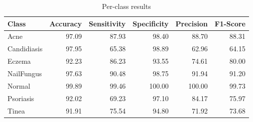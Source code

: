 \begin{table}
\caption{Per-class results}
\label{tab:results}
\begin{tabular}{lrrrrr}
\toprule
Class & Accuracy & Sensitivity & Specificity & Precision & F1-Score \\
\midrule
Acne & 97.09 & 87.93 & 98.40 & 88.70 & 88.31 \\
Candidiasis & 97.95 & 65.38 & 98.89 & 62.96 & 64.15 \\
Eczema & 92.23 & 86.23 & 93.55 & 74.61 & 80.00 \\
NailFungus & 97.63 & 90.48 & 98.75 & 91.94 & 91.20 \\
Normal & 99.89 & 99.46 & 100.00 & 100.00 & 99.73 \\
Psoriasis & 92.02 & 69.23 & 97.10 & 84.17 & 75.97 \\
Tinea & 91.91 & 75.54 & 94.80 & 71.92 & 73.68 \\
\bottomrule
\end{tabular}
\end{table}
